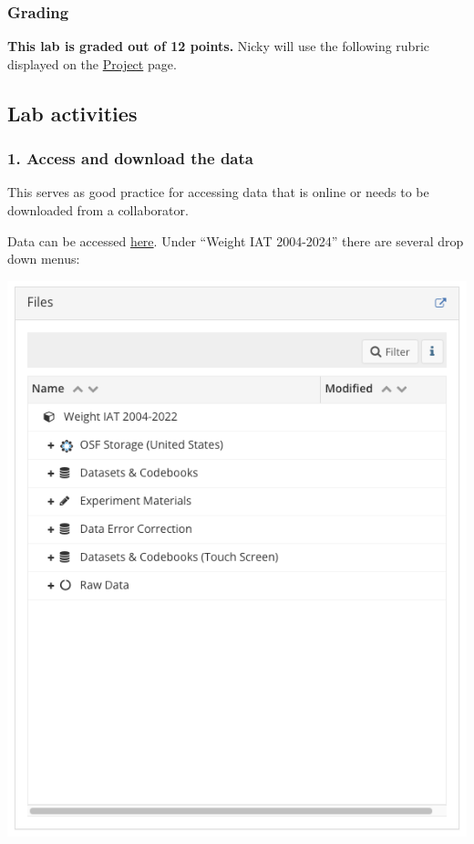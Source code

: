 \documentclass[
  letterpaper,
  DIV=11,
  numbers=noendperiod]{scrartcl}
\begin{document}
\hypertarget{grading}{%
\subsubsection{Grading}\label{grading}}

\textbf{This lab is graded out of 12 points.} Nicky will use the
following rubric displayed on the \href{../project.qmd}{Project} page.

\hypertarget{lab-activities}{%
\subsection{Lab activities}\label{lab-activities}}

\hypertarget{access-and-download-the-data}{%
\subsubsection{1. Access and download the
data}\label{access-and-download-the-data}}

This serves as good practice for accessing data that is online or needs
to be downloaded from a collaborator.

Data can be accessed \href{https://osf.io/iay3x/}{here}. Under ``Weight
IAT 2004-2024'' there are several drop down menus:

\includegraphics{images/data_access_1.png}
\end{document}
